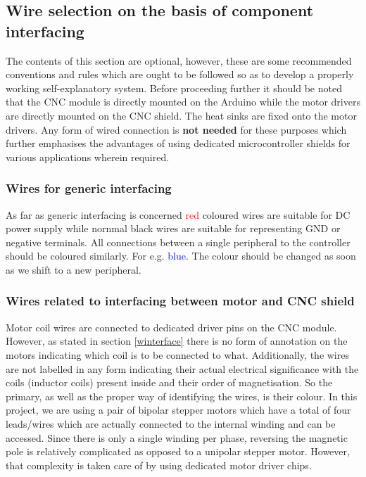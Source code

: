 \subsection{Wire selection on the basis of component interfacing}

The contents of this section are optional, however, these are some recommended conventions and rules which are ought to be followed so as to develop a properly working self-explanatory system. Before proceeding further it should be noted that the CNC module is directly mounted on the Arduino while the motor drivers are directly mounted on the CNC shield. The heat sinks are fixed onto the motor drivers. Any form of wired connection is \textbf{not needed} for these purposes which further emphasises the advantages of using dedicated microcontroller shields for various applications wherein required.

\subsubsection*{Wires for generic interfacing}
As far as generic interfacing is concerned \textcolor{red}{red} coloured wires are suitable for DC power supply while nornmal black wires are suitable for representing GND or negative terminals. All connections between a single peripheral to the controller should be coloured similarly. For e.g. \textcolor{blue}{blue}. The colour should be changed as soon as we shift to a new peripheral.

\subsubsection*{Wires related to interfacing between motor and CNC shield}

Motor coil wires are connected to dedicated driver pins on the CNC module. However, as stated in section \ref{winterface} there is no form of annotation on the motors indicating which coil is to be connected to what. Additionally, the wires are not labelled in any form indicating their actual electrical significance with the coils (inductor coils) present inside and their order of magnetisation. So the primary, as well as the proper way of identifying the wires, is their colour. In this project, we are using a pair of bipolar stepper motors which have a total of four leads/wires which are actually connected to the internal winding and can be accessed. Since there is only a single winding per phase, reversing the magnetic pole is relatively complicated as opposed to a unipolar stepper motor. However, that complexity is taken care of by using dedicated motor driver chips. \par

